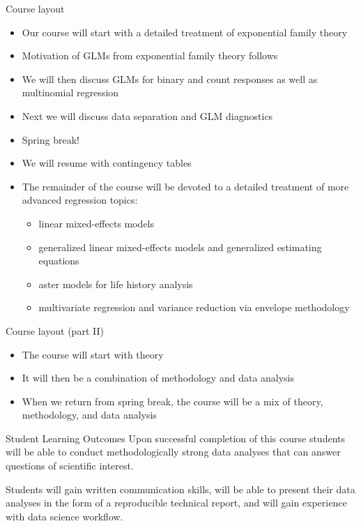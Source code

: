 \documentclass[
  ignorenonframetext,
]{beamer}
\providecommand{\tightlist}{%
  \setlength{\itemsep}{0pt}\setlength{\parskip}{0pt}}
\begin{document}
\begin{frame}{Course layout}
\protect\hypertarget{course-layout}{}
\begin{itemize}
\tightlist
\item
  Our course will start with a detailed treatment of exponential family
  theory
\item
  Motivation of GLMs from exponential family theory follows
\item
  We will then discuss GLMs for binary and count responses as well as
  multinomial regression
\item
  Next we will discuss data separation and GLM diagnostics
\item
  Spring break!
\item
  We will resume with contingency tables
\item
  The remainder of the course will be devoted to a detailed treatment of
  more advanced regression topics:

  \begin{itemize}
  \tightlist
  \item
    linear mixed-effects models
  \item
    generalized linear mixed-effects models and generalized estimating
    equations
  \item
    aster models for life history analysis
  \item
    multivariate regression and variance reduction via envelope
    methodology
  \end{itemize}
\end{itemize}
\end{frame}

\begin{frame}{Course layout (part II)}
\protect\hypertarget{course-layout-part-ii}{}
\begin{itemize}
\tightlist
\item
  The course will start with theory
\item
  It will then be a combination of methodology and data analysis
\item
  When we return from spring break, the course will be a mix of theory,
  methodology, and data analysis
\end{itemize}
\end{frame}

\begin{frame}{Student Learning Outcomes}
\protect\hypertarget{student-learning-outcomes}{}
Upon successful completion of this course students will be able to
conduct methodologically strong data analyses that can answer questions
of scientific interest.

Students will gain written communication skills, will be able to present
their data analyses in the form of a reproducible technical report, and
will gain experience with data science workflow.
\end{frame}
\end{document}
